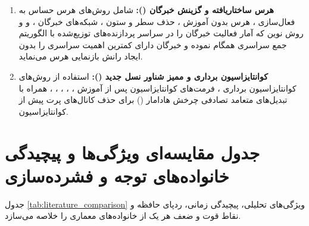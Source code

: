 \documentclass[12pt,a4paper]{report}
\theoremstyle{definition}
\begin{document}
\begin{enumerate}
    \item \textbf{هرس ساختاریافته و گزینش خبرگان ():} شامل روش‌های هرس حساس به فعال‌سازی  \cite{sun2024wanda}، هرس بدون آموزش  \cite{frantar2023sparsegpt}، حذف سطر و ستون  \cite{ashkboos2024slicegpt}، شبکه‌های خبرگان  \cite{fedus2022switch}،  \cite{zhou2022expert} و  \cite{jiang2024mixtral} و روش نوین  که آمار فعالیت خبرگان را در سراسر پردازنده‌های توزیع‌شده با الگوریتم جمع سراسری  همگام نموده و خبرگان دارای کمترین اهمیت سراسری را بدون ایجاد رانش بازنمایی هرس می‌نماید.
    \item \textbf{کوانتایزاسیون برداری و ممیز شناور نسل جدید ():} استفاده از روش‌های کوانتایزاسیون برداری \cite{stock2020bit}، فرمت‌های کوانتایزاسیون پس از آموزش  \cite{lin2024awq}،  \cite{frantar2023gptq}،  \cite{xiao2023smoothquant}،  \cite{dettmers2022llmint8}،  \cite{badri2023hqq}، همراه با تبدیل‌های متعامد تصادفی چرخش هادامار () \cite{ashkboos2024quarot} برای حذف کانال‌های پرت پیش از کوانتایزاسیون.
\end{enumerate}

\section{جدول مقایسه‌ای ویژگی‌ها و پیچیدگی خانواده‌های توجه و فشرده‌سازی}
جدول \ref{tab:literature_comparison} ویژگی‌های تحلیلی، پیچیدگی زمانی، ردپای حافظه و نقاط قوت و ضعف هر یک از خانواده‌های معماری را خلاصه می‌سازد.
\end{document}
